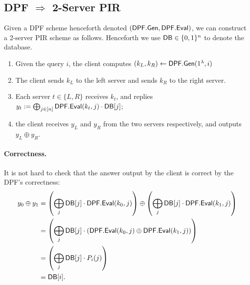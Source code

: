 \subsection{DPF $\Longrightarrow$ 2-Server PIR}

Given a DPF scheme henceforth denoted $({\sf DPF.Gen}, {\sf DPF.Eval})$, 
we can construct 
a 2-server PIR scheme as follows.
Henceforth we use ${\sf DB} \in \{0, 1\}^n$ 
to denote the database.


\begin{enumerate}
    \item Given the query $i$, the client 
computes $(k_L,k_R) \leftarrow {\sf DPF}.{\sf Gen}(1^\lambda, i)$
    \item The client sends %
$k_L$ to the left server and sends $k_R$ to the right server. 
    \item %
Each server $t \in \{L, R\}$ receives $k_t$, 
and replies 
$y_t := \bigoplus_{j\in [n]} {\sf DPF}.{\sf Eval}(k_t,j)\cdot {\sf DB}[j]$;
    \item the client receives
$y_L$ and $y_R$ from the two servers respectively, 
and  outputs $y_L \oplus y_R$.
\end{enumerate}

\paragraph{Correctness.} 
It is not hard to check that the answer output by the client
is correct by the DPF's correctness:  
\begin{align*} 
    y_0 \oplus y_1 & = \left(\bigoplus_{j}{\sf DB}[j]\cdot {\sf DPF.Eval}(k_0,j) \right) \oplus \left(\bigoplus_{j}\mathsf{DB}[j]\cdot {\sf DPF}.{\sf Eval}(k_1,j) \right) \\
    & = \left(\bigoplus_{j}{\sf DB}[j]\cdot ({\sf DPF.Eval}(k_0,j)\oplus {\sf DPF}.{\sf Eval}(k_1,j)) \right) \\
    & = \left(\bigoplus_{j}{\sf DB}[j]\cdot P_{i}(j)\right) \\
    & = {\sf DB}[i].
\end{align*}

